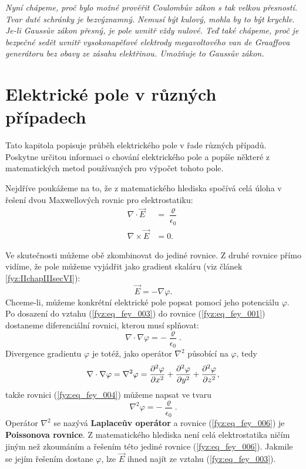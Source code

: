 {  \emph{Nyní chápeme, proč bylo možné prověřit Coulombův zákon s tak velkou přesností. Tvar 
  duté schránky je bezvýznamný. Nemusí být kulový, mohla by to být krychle. Je-li Gaussův zákon 
  přesný, je pole uvnitř vždy nulové. Teď také chápeme, proč je bezpečné sedět uvnitř 
  vysokonapěťové elektrody megavoltového van de Graaffova generátoru bez obavy ze zásahu 
  elektřinou. Umožňuje to Gaussův zákon.}

\section{Elektrické pole v různých případech}\label{fyz:IIchapVsecX}
  Tato kapitola popisuje průběh elektrického pole v řade různých případů. Poskytne určitou 
  informaci o chování elektrického pole a popíše některé z matematických metod používaných pro 
  výpočet tohoto pole.
  
  Nejdříve poukážeme na to, že z matematického hlediska spočívá celá úloha v řešení dvou 
  Maxwellových rovnic pro elektrostatiku:
  \begin{align}
    \nabla\cdot\vec{E}  &= \dfrac{\varrho}{\epsilon_0}  \label{fyz:eq_fey_001} \\
    \nabla\times\vec{E} &= 0.                           \label{fyz:eq_fey_002}
  \end{align}
  
  Ve skutečnosti můžeme obě zkombinovat do jediné rovnice. Z druhé rovnice přímo vidíme, že pole 
  můžeme vyjádřit jako gradient skaláru (viz článek \ref{fyz:IIchapIIIsecVI}):
  \begin{equation}\label{fyz:eq_fey_003}
    \vec{E} = - \nabla\varphi.
  \end{equation}
  Chceme-li, můžeme konkrétní elektrické pole popsat pomocí jeho potenciálu \(\varphi\). Po 
  dosazení do vztahu (\ref{fyz:eq_fey_003}) do rovnice (\ref{fyz:eq_fey_001}) dostaneme 
  diferenciální rovnici, kterou musí splňovat:
  \begin{equation}\label{fyz:eq_fey_004}
  \nabla\cdot\nabla\varphi = - \dfrac{\varrho}{\epsilon_0}.
  \end{equation}
  Divergence gradientu \(\varphi\) je totéž, jako operátor \(\nabla^2\) působící na \(\varphi\), 
  tedy
  \begin{equation}\label{fyz:eq_fey_005}
  \nabla\cdot\nabla\varphi = \nabla^2\varphi 
    = \dfrac{\partial^2 \varphi}{\partial x^2} + \dfrac{\partial^2 \varphi}{\partial y^2} + \dfrac{\partial^2 \varphi}{\partial z^2},
  \end{equation}
  takže rovnici (\ref{fyz:eq_fey_004}) můžeme napsat ve tvaru
  \begin{equation}\label{fyz:eq_fey_006}
  \nabla^2\varphi = - \dfrac{\varrho}{\epsilon_0}.
  \end{equation}
  Operátor \(\nabla^2\) se nazývá \textbf{Laplaceův operátor} a rovnice (\ref{fyz:eq_fey_006}) je 
  \textbf{Poissonova rovnice}. Z matematického hlediska není celá elektrostatika ničím jiným než 
  zkoumáním a řešením této jediné rovnice (\ref{fyz:eq_fey_006}). Jakmile se jejím řešením 
  dostane \(\varphi\), lze \(\vec{E}\) ihned najít ze vztahu (\ref{fyz:eq_fey_003}).
  
}

